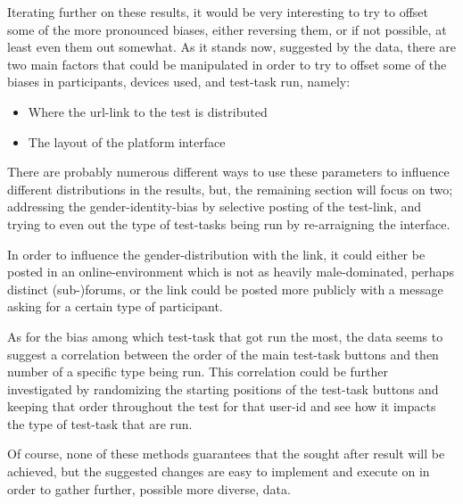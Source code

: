   Iterating further on these results, it would be
  very interesting to try to offset some of the more pronounced biases, either
  reversing them, or if not possible, at least even them out somewhat.
  As it stands now, suggested by the data, there are two main factors that
  could be manipulated in order to try to offset some of the biases in
  participants, devices used, and test-task run, namely:

  \begin{itemize}
    \item{Where the url-link to the test is distributed}
    \item{The layout of the platform interface}
  \end{itemize}

  There are probably numerous different ways to use these parameters to
  influence different distributions in the results, but, the remaining section
  will focus on two; addressing the gender-identity-bias by selective posting
  of the test-link, and trying to even out the type of test-tasks being run by
  re-arraigning the interface.

  In order to influence the gender-distribution with the link, it could
  either be posted in an online-environment which is not as heavily
  male-dominated, perhaps distinct (sub-)forums, or the link could be posted
  more publicly with a message asking for a certain type of participant.

  As for the bias among which test-task that got run the most, the data seems
  to suggest a correlation between the order of the main test-task buttons and
  then number of a specific type being run. This correlation could be further
  investigated by randomizing the starting positions of the test-task buttons
  and keeping that order throughout the test for that user-id and see how it
  impacts the type of test-task that are run.

  Of course, none of these methods guarantees that the sought after result will
  be achieved, but the suggested changes are easy to implement and execute on
  in order to gather further, possible more diverse, data.


